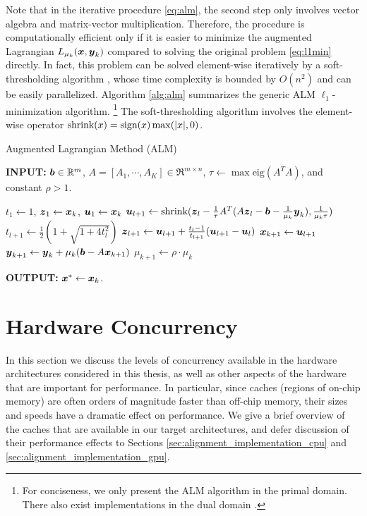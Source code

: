 Note that in the iterative procedure \eqref{eq:alm}, the second
step only involves vector algebra and matrix-vector multiplication. Therefore,
the procedure is computationally efficient only if it is easier to minimize the
augmented Lagrangian $L_{\mu_k} ({\boldsymbol{x}},{\boldsymbol{y}}_k)$ compared to solving the original problem
\eqref{eq:l1min} directly. In fact, this problem can be solved element-wise
iteratively by a soft-thresholding algorithm \cite{WrightS2008,BeckA2009},
whose time complexity is bounded by $O(n^2)$ and can be easily parallelized.
Algorithm \ref{alg:alm} summarizes the generic ALM $\ell_1$-minimization algorithm. \footnote{For conciseness, we
only present the ALM algorithm in the primal domain. There also
exist implementations in the dual domain \cite{YangJ2009,YangA2010-ICIP}.}
The soft-thresholding algorithm involves the element-wise operator ${\text{shrink}}(x) = {\text{sign}}(x)\max(|x|,0)$.

 \begin{algorithm}[h]
\caption{Augmented Lagrangian Method (ALM)}
\small
{\bf INPUT:} $\boldsymbol{b} \in \mathbb R^m$, $A=[A_1,\cdots, A_K] \in \Re^{m \times n}$, $\tau\leftarrow \max\mbox{eig}(A^TA)$, and constant $\rho>1$.
\begin{algorithmic}[1]
\STATE $t_1 \leftarrow 1$, ${\boldsymbol{z}}_1 \leftarrow {\boldsymbol{x}}_k$, ${\boldsymbol{u}}_1 \leftarrow {\boldsymbol{x}}_k$ 
\STATE ${\boldsymbol{u}}_{l+1}  \leftarrow {\text{shrink}}({\boldsymbol{z}}_l - \frac{1}{\tau}A^T(A{\boldsymbol{z}}_l - \boldsymbol{b} - \frac{1}{\mu_k}{\boldsymbol{y}}_k), \frac{1}{\mu_k\tau})$
\STATE $t_{l+1} \leftarrow \frac{1}{2}( 1 + \sqrt{1+4t_l^2})$
\STATE ${\boldsymbol{z}}_{l+1} \leftarrow {\boldsymbol{u}}_{l+1}+ \frac{t_l - 1}{t_{l+1}}({\boldsymbol{u}}_{l+1} - {\boldsymbol{u}}_l)$ 
\ENDWHILE 
\STATE ${\boldsymbol{x}}_{k+1} \leftarrow {\boldsymbol{u}}_{l+1}$ 
\STATE ${\boldsymbol{y}}_{k+1} \leftarrow {\boldsymbol{y}}_k + \mu_k (\boldsymbol{b} - A{\boldsymbol{x}}_{k+1})$ 
\STATE $\mu_{k+1} \leftarrow \rho\cdot\mu_k$ 
\ENDWHILE 
\end{algorithmic}

{\bf OUTPUT:} ${\boldsymbol{x}}^* \leftarrow {\boldsymbol{x}}_k$.
\label{alg:alm} 
\end{algorithm}

\section{Hardware Concurrency} \label{sec:concurrency}
In this section we discuss the levels of concurrency available in the hardware
architectures considered in this thesis, as well as other aspects of the
hardware that are important for performance.  In particular, since caches
(regions of on-chip memory) are often orders of magnitude faster than off-chip
memory, their sizes and speeds have a dramatic effect on performance.  We give a
brief overview of the caches that are available in our target architectures,
and defer discussion of their performance effects to Sections
\ref{sec:alignment_implementation_cpu} and
\ref{sec:alignment_implementation_gpu}.

